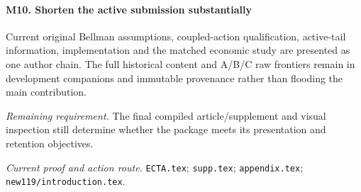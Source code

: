 \paragraph{M10. Shorten the active submission substantially}

Current original Bellman assumptions, coupled-action qualification, active-tail information, implementation and the matched economic study are presented as one author chain. The full historical content and A/\allowbreak{}B/\allowbreak{}C raw frontiers remain in development companions and immutable provenance rather than flooding the main contribution.

\par\emph{Remaining requirement.} The final compiled article/\allowbreak{}supplement and visual inspection still determine whether the package meets its presentation and retention objectives.

\par\emph{Current proof and action route.} \nolinkurl{ECTA.tex}; \nolinkurl{supp.tex}; \nolinkurl{appendix.tex}; \nolinkurl{new119/introduction.tex}.

\endgroup
